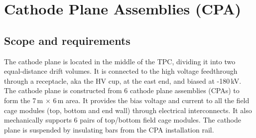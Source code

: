


\section{Cathode Plane Assemblies (CPA)}
\label{sec:cpa}

\subsection{Scope and requirements}


The cathode plane is located in the middle of the TPC, dividing it into two equal-distance drift volumes.  It is connected to the high voltage feedthrough through a receptacle, aka the HV cup, at the east end, and biased at -180\,kV.  The cathode plane is constructed from 6 cathode plane assemblies (CPAs) to form the 7\,m $\times$ 6\,m area.  It provides the bias voltage and current to all the field cage modules (top, bottom and end wall) through electrical interconnects.  It also mechanically supports 6 pairs of top/bottom field cage modules.
The cathode plane is suspended by insulating bars from the CPA installation rail.


